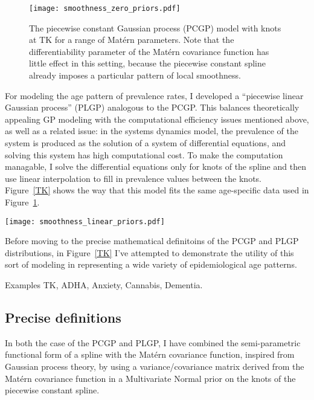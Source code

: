 \begin{figure}
\begin{center}
\texttt{[image: smoothness\_zero\_priors.pdf]}
\end{center}
\caption{The piecewise constant Gaussian process (PCGP) model with
  knots at TK for a range of Mat\'{e}rn parameters.  Note that the
  differentiability parameter of the Mat\'{e}rn covariance function
  has little effect in this setting, because the piecewise constant
  spline already imposes a particular pattern of local smoothness.}
\label{TK1}
\end{figure}

For modeling the age pattern of prevalence rates, I developed a
``piecewise linear Gaussian process'' (PLGP) analogous to the
PCGP. This balances theoretically appealing GP modeling with the
computational efficiency issues mentioned above, as well as a related
issue: in the systems dynamics model, the prevalence of the system is
produced as the solution of a system of differential equations, and
solving this system has high computational cost.  To make the
computation managable, I solve the differential equations only for
knots of the spline and then use linear interpolation to fill in
prevalence values between the knots.  Figure~\ref{TK} shows the way
that this model fits the same age-specific data used in
Figure~\ref{TK1}.

\begin{center}
\texttt{[image: smoothness\_linear\_priors.pdf]}
\end{center}

Before moving to the precise mathematical definitoins of the PCGP and
PLGP distributions, in Figure~\ref{TK} I've attempted to demonstrate
the utility of this sort of modeling in representing a wide variety of
epidemiological age patterns.

Examples TK, ADHA, Anxiety, Cannabis, Dementia.

\subsection{Precise definitions}
\label{theory-age_pattern_model-PCGP_PLGP}
In both the case of the PCGP and PLGP, I have combined the
semi-parametric functional form of a spline with the Mat\'{e}rn
covariance function, inspired from Gaussian process theory, by using a
variance/covariance matrix derived from the Mat\'{e}rn covariance function
in a Multivariate Normal prior on the knots of the piecewise constant
spline.

